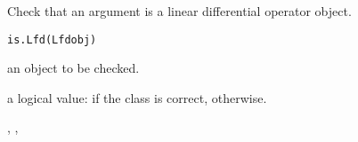 \begin{Description}\relax
Check that an argument is a linear differential operator object.
\end{Description}
\begin{Usage}
\begin{verbatim}
is.Lfd(Lfdobj)
\end{verbatim}
\end{Usage}
\begin{Arguments}
\begin{ldescription}
\item[\code{Lfdobj}] an object to be checked.

\end{ldescription}
\end{Arguments}
\begin{Value}
a logical value:
 if the class is correct,  otherwise.
\end{Value}
\begin{SeeAlso}\relax
{}, 
, 
\end{SeeAlso}

